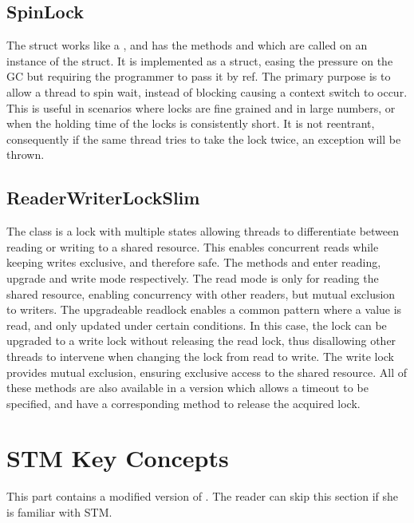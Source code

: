 \subsection{SpinLock}
The  struct\cite{msdnSpinLock} works like a , and has the methods   and  which are called on an instance of the struct. It is implemented as a struct, easing the pressure on the \ac{GC} but requiring the programmer to pass it by ref. The primary purpose is to allow a thread to spin wait, instead of blocking causing a context switch to occur. This is useful in scenarios where locks are fine grained and in large numbers, or when the holding time of the locks is consistently short. It is not reentrant, consequently if the same thread tries to take the lock twice, an exception will be thrown. 

\subsection{ReaderWriterLockSlim}
The class \cite{msdnReaderWriterLockSlim} is a lock with multiple states allowing threads to differentiate between reading or writing to a shared resource. This enables concurrent reads while keeping writes exclusive, and therefore safe. The methods   and  enter reading, upgrade and write mode respectively. The read mode is only for reading the shared resource, enabling concurrency with other readers, but mutual exclusion to writers. The upgradeable readlock enables a common pattern where a value is read, and only updated under certain conditions. In this case, the lock can be upgraded to a write lock without releasing the read lock, thus disallowing other threads to intervene when changing the lock from read to write. The write lock provides mutual exclusion, ensuring exclusive access to the shared resource. All of these methods are also available in a version which allows a timeout to be specified, and have a corresponding  method to release the acquired lock.

\section{STM Key Concepts}
This part contains a modified version of \cite[p. 43-48]{dpt907e14trending}. The reader can skip this section if she is familiar with \ac{STM}.  
\label{chap:stm_key_concepts}

